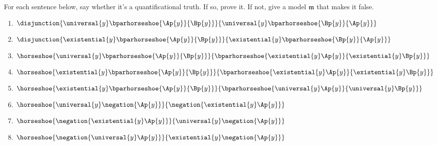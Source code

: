 For each sentence below, say whether it's a quantificational truth. 
If so, prove it. 
If not, give a model $\mathfrak{m}$ that makes it false.
\begin{multicols}{2}
\begin{enumerate}
\item {$\disjunction{\universal{\variable{y}}\bparhorseshoe{\Ap{\variable{y}}}{\Bp{\variable{y}}}}{\universal{\variable{y}}\bparhorseshoe{\Bp{\variable{y}}}{\Ap{\variable{y}}}}$}
\item {$\disjunction{\existential{\variable{y}}\bparhorseshoe{\Ap{\variable{y}}}{\Bp{\variable{y}}}}{\existential{\variable{y}}\bparhorseshoe{\Bp{\variable{y}}}{\Ap{\variable{y}}}}$}
\item {$\horseshoe{\universal{\variable{y}}\bparhorseshoe{\Ap{\variable{y}}}{\Bp{\variable{y}}}}{\bparhorseshoe{\existential{\variable{y}}\Ap{\variable{y}}}{\existential{\variable{y}}\Bp{\variable{y}}}}$}
\item {$\horseshoe{\existential{\variable{y}}\bparhorseshoe{\Ap{\variable{y}}}{\Bp{\variable{y}}}}{\bparhorseshoe{\existential{\variable{y}}\Ap{\variable{y}}}{\existential{\variable{y}}\Bp{\variable{y}}}}$}
\item {$\horseshoe{\existential{\variable{y}}\bparhorseshoe{\Ap{\variable{y}}}{\Bp{\variable{y}}}}{\bparhorseshoe{\universal{\variable{y}}\Ap{\variable{y}}}{\universal{\variable{y}}\Bp{\variable{y}}}}$}
\item {$\horseshoe{\universal{\variable{y}}\negation{\Ap{\variable{y}}}}{\negation{\existential{\variable{y}}\Ap{\variable{y}}}}$}
\item {$\horseshoe{\negation{\existential{\variable{y}}\Ap{\variable{y}}}}{\universal{\variable{y}}\negation{\Ap{\variable{y}}}}$}
\item {$\horseshoe{\negation{\universal{\variable{y}}\Ap{\variable{y}}}}{\existential{\variable{y}}\negation{\Ap{\variable{y}}}}$}
\end{enumerate}
\end{multicols}
